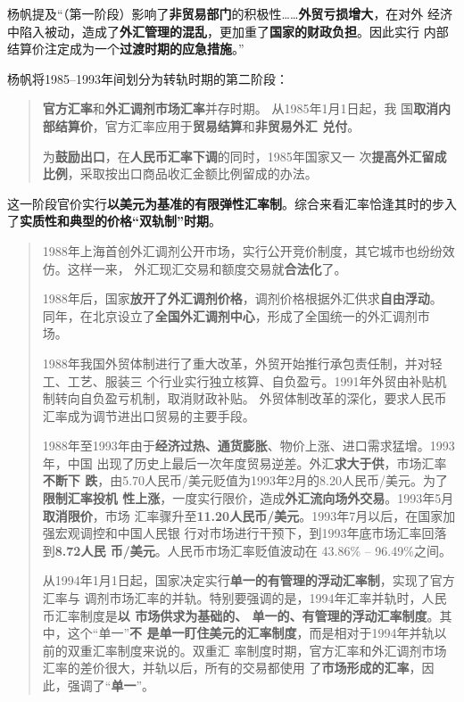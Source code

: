 杨帆提及“（第一阶段）影响了\textbf{非贸易部门}的积极性……\textbf{外贸亏损增大}，在对外
经济中陷入被动，造成了\textbf{外汇管理的混乱}，更加重了\textbf{国家的财政负担}。因此实行
内部结算价注定成为一个\textbf{过渡时期的应急措施}。”

杨帆将1985--1993年间划分为转轨时期的第二阶段：
\begin{quotation}
  \textbf{官方汇率}和\textbf{外汇调剂市场汇率}并存时期。 从1985年1月1日起，我
  国\textbf{取消内部结算价}，官方汇率应用于\textbf{贸易结算}和\textbf{非贸易外汇
    兑付}。

  为\textbf{鼓励出口}，在\textbf{人民币汇率下调}的同时，1985年国家又一
  次\textbf{提高外汇留成比例}，采取按出口商品收汇金额比例留成的办法。
\end{quotation}
这一阶段官价实行\textbf{以美元为基准的有限弹性汇率制}。综合来看汇率恰逢其时的步入
了\textbf{实质性和典型的价格“双轨制”时期}。

\begin{quotation}
1988年上海首创外汇调剂公开市场，实行公开竞价制度，其它城市也纷纷效仿。这样一来，
外汇现汇交易和额度交易就\textbf{合法化}了。\cite[769-770]{fengyunshi1b}

1988年后，国家\textbf{放开了外汇调剂价格}，调剂价格根据外汇供求\textbf{自由浮动}。
同年，在北京设立了\textbf{全国外汇调剂中心}，形成了全国统一的外汇调剂市
场。\cite{wangqiangshehui}

1988年我国外贸体制进行了重大改革，外贸开始推行承包责任制，并对轻工、工艺、服装三
个行业实行独立核算、自负盈亏。1991年外贸由补贴机制转向自负盈亏机制，取消财政补贴。
外贸体制改革的深化，要求人民币汇率成为调节进出口贸易的主要手段。

1988年至1993年由于\textbf{经济过热、通货膨胀}、物价上涨、进口需求猛增。1993年，中国
出现了历史上最后一次年度贸易逆差。外汇\textbf{求大于供}，市场汇率\textbf{不断下
  跌}，由5.70人民币/美元贬值为1993年2月的8.20人民币/美元。为了\textbf{限制汇率投机
  性上涨}，一度实行限价，造成\textbf{外汇流向场外交易}。1993年5月\textbf{取消限价}，市场
汇率骤升至\textbf{11.20人民币/美元}。1993年7月以后，在国家加强宏观调控和中国人民银
行对市场进行干预下，到1993年底市场汇率回落到\textbf{8.72人民
  币/美元}。\cite{huilvshi}人民币市场汇率贬值波动在 43.86\% -- 96.49\%之间。


从1994年1月1日起，国家决定实行\textbf{单一的有管理的浮动汇率制}，实现了官方汇率与
调剂市场汇率的并轨。特别要强调的是，1994年汇率并轨时，人民币汇率制度是\textbf{以
  市场供求为基础的、 单一的、有管理的浮动汇率制度}。其中，这个“单一”\textbf{不
  是单一盯住美元的汇率制度}，而是相对于1994年并轨以前的双重汇率制度来说的。双重汇
率制度时期，官方汇率和外汇调剂市场汇率的差价很大，并轨以后，所有的交易都使用
了\textbf{市场形成的汇率}，因此，强调了“\textbf{单一}”。\cite{guantaohuigai}
\end{quotation}

